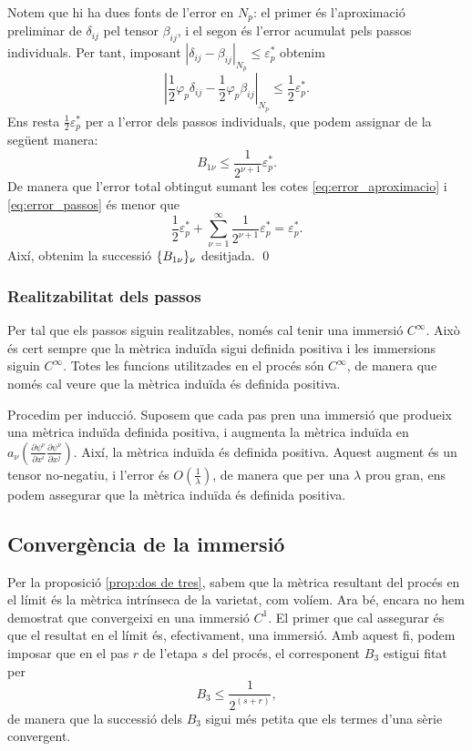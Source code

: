 {Notem que hi ha dues fonts de l'error en $N_p$: el primer és l'aproximació preliminar de $\delta_{ij}$ pel tensor $\beta_{ij}$, i el segon és l'error acumulat pels passos individuals. Per tant, imposant $|\delta_{ij}-\beta_{ij}|_{N_p} \le \varepsilon_p^*$ obtenim 
\begin{equation}\label{eq:error_aproximacio}
    \left|\frac12\varphi_p\delta_{ij}-\frac12\varphi_p\beta_{ij}\right|_{N_p} \le \frac12\varepsilon_p^*.
\end{equation}
Ens resta $\frac12\varepsilon_p^*$
per a l'error dels passos individuals, que podem assignar de la següent manera:
\begin{equation}\label{eq:error_passos}
    B_{1\nu} \le \frac{1}{2^{\nu+1}}\varepsilon_p^*.
\end{equation}
De manera que l'error total obtingut sumant les cotes \eqref{eq:error_aproximacio} i \eqref{eq:error_passos} és menor que
\begin{equation*}
    \frac12\varepsilon_p^* + \sum_{\nu=1}^\infty \frac1{2^{\nu+1}}\varepsilon_p^* = \varepsilon_p^*.
\end{equation*}
Així, obtenim la successió $\{B_{1\nu}\}_{\nu}$ desitjada.
\qed
}
\subsubsection{Realitzabilitat dels passos}
Per tal que els passos siguin realitzables, només cal tenir una immersió $C^\infty$. Això és cert sempre que la mètrica induïda sigui definida positiva i les immersions siguin $C^\infty$. Totes les funcions utilitzades en el procés són $C^\infty$, de manera que només cal veure que la mètrica induïda és definida positiva.

Procedim per inducció. Suposem que cada pas pren una immersió que produeix una mètrica induïda definida positiva, i augmenta la mètrica induïda en $a_\nu\left(\frac{\partial\psi^\nu}{\partial x^i}\frac{\partial\psi^\nu}{\partial x^j}\right)$. Així, la mètrica induïda és definida positiva. Aquest augment és un tensor no-negatiu, i l'error és $O\left(\frac1{\lambda}\right)$, de manera que per una $\lambda$ prou gran, ens podem assegurar que la mètrica induïda és definida positiva.

\subsection{Convergència de la immersió}
Per la proposició \ref{prop:dos de tres}, sabem que la mètrica resultant del procés en el límit és la mètrica intrínseca de la varietat, com volíem. Ara bé, encara no hem demostrat que convergeixi en una immersió $C^1$. El primer que cal assegurar és que el resultat en el límit és, efectivament, una immersió. Amb aquest fi, podem imposar que en el pas $r$ de l'etapa $s$ del procés, el corresponent $B_3$ estigui fitat per
\begin{equation}\label{eq:b3_cota}
    B_{3} \le \frac1{2^{(s+r)}},
\end{equation}
de manera que la successió dels $B_3$ sigui més petita que els termes d'una sèrie convergent.

